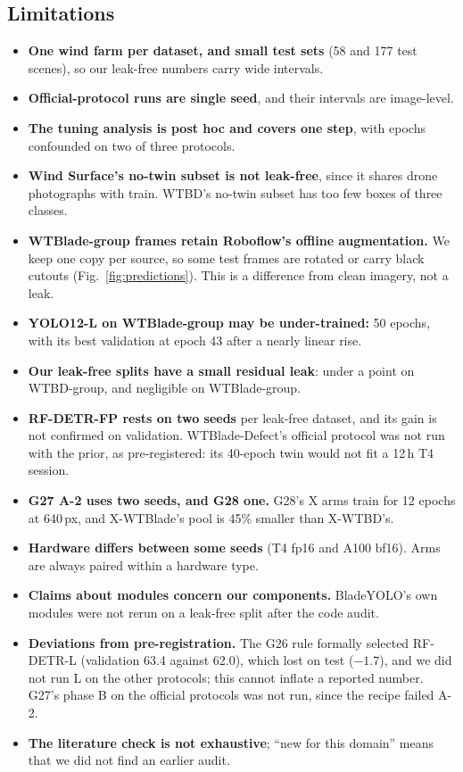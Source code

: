 \subsection{Limitations}
\label{sec:limits}
\begin{itemize}
\item \textbf{One wind farm per dataset, and small test sets} (58 and 177 test scenes), so our leak-free numbers carry wide intervals.
\item \textbf{Official-protocol runs are single seed}, and their intervals are image-level.
\item \textbf{The tuning analysis is post hoc and covers one step}, with epochs confounded on two of three protocols.
\item \textbf{Wind Surface's no-twin subset is not leak-free}, since it shares drone photographs with train. WTBD's no-twin subset has too few boxes of three classes.
\item \textbf{WTBlade-group frames retain Roboflow's offline augmentation.} We keep one copy per source, so some test frames are rotated or carry black cutouts (Fig.~\ref{fig:predictions}). This is a difference from clean imagery, not a leak.
\item \textbf{YOLO12-L on WTBlade-group may be under-trained:} 50 epochs, with its best validation at epoch 43 after a nearly linear rise.
\item \textbf{Our leak-free splits have a small residual leak}: under a point on WTBD-group, and negligible on WTBlade-group.
\item \textbf{RF-DETR-FP rests on two seeds} per leak-free dataset, and its gain is not confirmed on validation. WTBlade-Defect's official protocol was not run with the prior, as pre-registered: its 40-epoch twin would not fit a 12\,h T4 session.
\item \textbf{G27 A-2 uses two seeds, and G28 one.} G28's X arms train for 12 epochs at 640\,px, and X-WTBlade's pool is 45\% smaller than X-WTBD's.
\item \textbf{Hardware differs between some seeds} (T4 fp16 and A100 bf16). Arms are always paired within a hardware type.
\item \textbf{Claims about modules concern our components.} BladeYOLO's own modules were not rerun on a leak-free split after the code audit.
\item \textbf{Deviations from pre-registration.} The G26 rule formally selected RF-DETR-L (validation 63.4 against 62.0), which lost on test ($-1.7$), and we did not run L on the other protocols; this cannot inflate a reported number. G27's phase B on the official protocols was not run, since the recipe failed A-2.
\item \textbf{The literature check is not exhaustive}; ``new for this domain'' means that we did not find an earlier audit.
\end{itemize}

